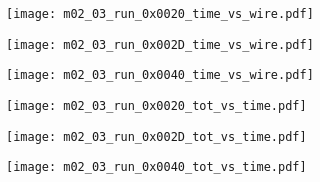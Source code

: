 \documentclass[11pt, ngerman, fleqn, DIV=15, headinclude, BCOR=2cm]{scrreprt}
\begin{document}
\begin{appendix}
	\begin{figure}
		\centering
	\begin{subfigure}[a]{0.45 \textwidth}
		\texttt{[image: m02\_03\_run\_0x0020\_time\_vs\_wire.pdf]}
		\caption{%
		}
		\label{fig:m02_03_run_0x0020_time_vs_wire}
	\end{subfigure}
	\begin{subfigure}[a]{0.45 \textwidth}
		\texttt{[image: m02\_03\_run\_0x002D\_time\_vs\_wire.pdf]}
		\caption{%
		}
		\label{fig:m02_03_run_0x002D_time_vs_wire}
	\end{subfigure}
	\begin{subfigure}[a]{0.45 \textwidth}
		\texttt{[image: m02\_03\_run\_0x0040\_time\_vs\_wire.pdf]}
		\caption{%
		}
		\label{fig:m02_03_run_0x0040_time_vs_wire}
	\end{subfigure}
	\caption{%
	}
	\label{fig:m02_03_time_vs_wire}
	\end{figure}


	\begin{figure}
		\centering
	\begin{subfigure}[a]{0.45 \textwidth}
		\texttt{[image: m02\_03\_run\_0x0020\_tot\_vs\_time.pdf]}
		\caption{%
		}
		\label{fig:m02_03_run_0x0020_tot_vs_time}
	\end{subfigure}
	\begin{subfigure}[a]{0.45 \textwidth}
		\texttt{[image: m02\_03\_run\_0x002D\_tot\_vs\_time.pdf]}
		\caption{%
		}
		\label{fig:m02_03_run_0x002D_tot_vs_time}
	\end{subfigure}
	\begin{subfigure}[a]{0.45 \textwidth}
		\texttt{[image: m02\_03\_run\_0x0040\_tot\_vs\_time.pdf]}
		\caption{%
		}
		\label{fig:m02_03_run_0x0040_tot_vs_time}
	\end{subfigure}
	\caption{%
	}
	\label{fig:m02_03_tot_vs_time}
	\end{figure}





\end{appendix}
\end{document}

